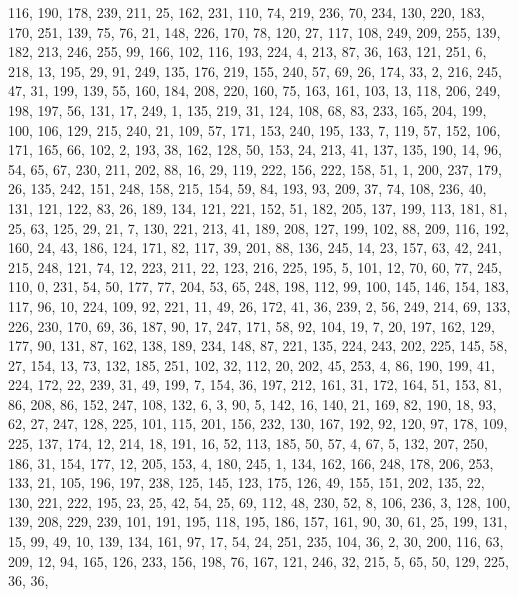 \begin{DoxyCode}
       116, 190, 178, 239, 211, 25, 162, 231, 110, 74, 219, 236, 70, 234, 130, 220, 183, 170, 251, 139, 75, 76, 21,
       148, 226, 170, 78, 120, 27, 117, 108, 249, 209, 255, 139, 182, 213, 246, 255, 99, 166, 102, 116, 193, 224,
       4, 213, 87, 36, 163, 121, 251, 6, 218, 13, 195, 29, 91, 249, 135, 176, 219, 155, 240, 57, 69, 26, 174, 33, 2,
       216, 245, 47, 31, 199, 139, 55, 160, 184, 208, 220, 160, 75, 163, 161, 103, 13, 118, 206, 249, 198, 197,
       56, 131, 17, 249, 1, 135, 219, 31, 124, 108, 68, 83, 233, 165, 204, 199, 100, 106, 129, 215, 240, 21, 109, 57,
       171, 153, 240, 195, 133, 7, 119, 57, 152, 106, 171, 165, 66, 102, 2, 193, 38, 162, 128, 50, 153, 24, 213,
       41, 137, 135, 190, 14, 96, 54, 65, 67, 230, 211, 202, 88, 16, 29, 119, 222, 156, 222, 158, 51, 1, 200, 237,
       179, 26, 135, 242, 151, 248, 158, 215, 154, 59, 84, 193, 93, 209, 37, 74, 108, 236, 40, 131, 121, 122, 83,
       26, 189, 134, 121, 221, 152, 51, 182, 205, 137, 199, 113, 181, 81, 25, 63, 125, 29, 21, 7, 130, 221, 213, 41,
       189, 208, 127, 199, 102, 88, 209, 116, 192, 160, 24, 43, 186, 124, 171, 82, 117, 39, 201, 88, 136, 245, 14,
       23, 157, 63, 42, 241, 215, 248, 121, 74, 12, 223, 211, 22, 123, 216, 225, 195, 5, 101, 12, 70, 60, 77, 245,
       110, 0, 231, 54, 50, 177, 77, 204, 53, 65, 248, 198, 112, 99, 100, 145, 146, 154, 183, 117, 96, 10, 224,
       109, 92, 221, 11, 49, 26, 172, 41, 36, 239, 2, 56, 249, 214, 69, 133, 226, 230, 170, 69, 36, 187, 90, 17, 247,
       171, 58, 92, 104, 19, 7, 20, 197, 162, 129, 177, 90, 131, 87, 162, 138, 189, 234, 148, 87, 221, 135, 224,
       243, 202, 225, 145, 58, 27, 154, 13, 73, 132, 185, 251, 102, 32, 112, 20, 202, 45, 253, 4, 86, 190, 199, 41,
       224, 172, 22, 239, 31, 49, 199, 7, 154, 36, 197, 212, 161, 31, 172, 164, 51, 153, 81, 86, 208, 86, 152, 247,
       108, 132, 6, 3, 90, 5, 142, 16, 140, 21, 169, 82, 190, 18, 93, 62, 27, 247, 128, 225, 101, 115, 201, 156,
       232, 130, 167, 192, 92, 120, 97, 178, 109, 225, 137, 174, 12, 214, 18, 191, 16, 52, 113, 185, 50, 57, 4, 67,
       5, 132, 207, 250, 186, 31, 154, 177, 12, 205, 153, 4, 180, 245, 1, 134, 162, 166, 248, 178, 206, 253, 133,
       21, 105, 196, 197, 238, 125, 145, 123, 175, 126, 49, 155, 151, 202, 135, 22, 130, 221, 222, 195, 23, 25, 42,
       54, 25, 69, 112, 48, 230, 52, 8, 106, 236, 3, 128, 100, 139, 208, 229, 239, 101, 191, 195, 118, 195, 186,
       157, 161, 90, 30, 61, 25, 199, 131, 15, 99, 49, 10, 139, 134, 161, 97, 17, 54, 24, 251, 235, 104, 36, 2, 30,
       200, 116, 63, 209, 12, 94, 165, 126, 233, 156, 198, 76, 167, 121, 246, 32, 215, 5, 65, 50, 129, 225, 36, 36,

\end{DoxyCode}
